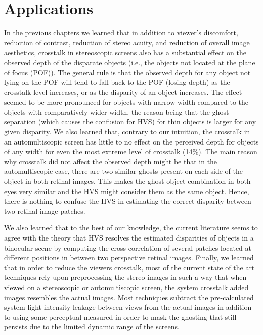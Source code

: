 \chapter{Applications}
\label{chap:applicatons}
In the previous chapters we learned that in addition to viewer's discomfort, reduction of contrast, reduction of stereo acuity, and reduction of overall image aesthetics, crosstalk in stereoscopic screens also has a substantial effect on the observed depth of the disparate objects (i.e., the objects not located at the plane of focus (POF)). The general rule is that the observed depth for any object not lying on the POF will tend to fall back to the POF (losing depth) as the crosstalk level increases, or as the disparity of an object increases. The effect seemed to be more pronounced for objects with narrow width compared to the objects with comparatively wider width, the reason being that the ghost separation (which causes the confusion for HVS) for thin objects is larger for any given disparity. We also learned that, contrary to our intuition, the crosstalk in an automultiscopic screen has little to no effect on the perceived depth for objects of any width for even the most extreme level of crosstalk (14\%). The main reason why crosstalk  did not affect the observed depth might be that in the automultiscopic case, there are two similar ghosts present on each side of the object in both retinal images. This makes the ghost-object combination in both eyes very similar and the HVS might consider them as the same object. Hence, there is nothing to confuse the HVS in estimating the correct disparity between two retinal image patches.

We also learned that to the best of our knowledge, the current literature seems to agree with the theory that HVS resolves the estimated disparities of objects in a binocular scene by computing the cross-correlation of several patches located at different positions in between two perspective retinal images. Finally, we learned that in order to reduce the viewers crosstalk, most of the current state of the art techniques rely upon preprocessing the stereo images in such a way that when viewed on a stereoscopic or automultiscopic screen, the system crosstalk added images resembles the actual images. Most techniques subtract the pre-calculated system light intensity leakage between views from the actual images in addition to using some perceptual measured in order to mask the ghosting that still persists due to the limited dynamic range of the screens.

